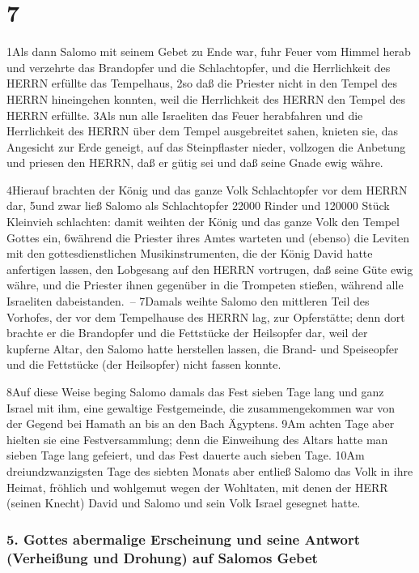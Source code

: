 \hypertarget{section-6}{%
\section{7}\label{section-6}}

1Als dann Salomo mit seinem Gebet zu Ende war, fuhr Feuer vom Himmel
herab und verzehrte das Brandopfer und die Schlachtopfer, und die
Herrlichkeit des HERRN erfüllte das Tempelhaus, 2so daß die Priester
nicht in den Tempel des HERRN hineingehen konnten, weil die Herrlichkeit
des HERRN den Tempel des HERRN erfüllte. 3Als nun alle Israeliten das
Feuer herabfahren und die Herrlichkeit des HERRN über dem Tempel
ausgebreitet sahen, knieten sie, das Angesicht zur Erde geneigt, auf das
Steinpflaster nieder, vollzogen die Anbetung und priesen den HERRN, daß
er gütig sei und daß seine Gnade ewig währe.

4Hierauf brachten der König und das ganze Volk Schlachtopfer vor dem
HERRN dar, 5und zwar ließ Salomo als Schlachtopfer 22000 Rinder und
120000 Stück Kleinvieh schlachten: damit weihten der König und das ganze
Volk den Tempel Gottes ein, 6während die Priester ihres Amtes warteten
und (ebenso) die Leviten mit den gottesdienstlichen Musikinstrumenten,
die der König David hatte anfertigen lassen, den Lobgesang auf den HERRN
vortrugen, daß seine Güte ewig währe, und die Priester ihnen gegenüber
in die Trompeten stießen, während alle Israeliten dabeistanden.~--
7Damals weihte Salomo den mittleren Teil des Vorhofes, der vor dem
Tempelhause des HERRN lag, zur Opferstätte; denn dort brachte er die
Brandopfer und die Fettstücke der Heilsopfer dar, weil der kupferne
Altar, den Salomo hatte herstellen lassen, die Brand- und Speiseopfer
und die Fettstücke (der Heilsopfer) nicht fassen konnte.

8Auf diese Weise beging Salomo damals das Fest sieben Tage lang und ganz
Israel mit ihm, eine gewaltige Festgemeinde, die zusammengekommen war
von der Gegend bei Hamath an bis an den Bach Ägyptens. 9Am achten Tage
aber hielten sie eine Festversammlung; denn die Einweihung des Altars
hatte man sieben Tage lang gefeiert, und das Fest dauerte auch sieben
Tage. 10Am dreiundzwanzigsten Tage des siebten Monats aber entließ
Salomo das Volk in ihre Heimat, fröhlich und wohlgemut wegen der
Wohltaten, mit denen der HERR (seinen Knecht) David und Salomo und sein
Volk Israel gesegnet hatte.

\hypertarget{gottes-abermalige-erscheinung-und-seine-antwort-verheiuxdfung-und-drohung-auf-salomos-gebet}{%
\subsubsection{5. Gottes abermalige Erscheinung und seine Antwort
(Verheißung und Drohung) auf Salomos
Gebet}\label{gottes-abermalige-erscheinung-und-seine-antwort-verheiuxdfung-und-drohung-auf-salomos-gebet}}

